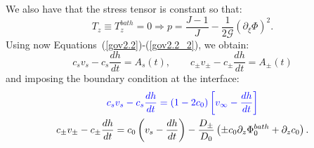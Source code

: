 \documentclass[12pt]{extarticle}
\begin{document}
We also have that the stress tensor is constant so that:
\begin{equation}
T_z\equiv T^{bath}_z=0 \Rightarrow p = \frac{J-1}{J}-\frac{1}{2\mathcal{G}} (\partial_\xi \Phi)^2.
\end{equation}
Using now Equations~(\ref{gov2.2})-(\ref{gov2.2_2}), we obtain:
\begin{equation}
c_s v_s - c_s \frac{dh}{dt}=A_s(t), \qquad c_\pm v_\pm - c_\pm \frac{dh}{dt}=A_\pm(t)
\end{equation}
and imposing the boundary condition at the interface:
\begin{gather}
\color{blue}c_s v_s - c_s \frac{dh}{dt}=(1-2c_0)\left[v_\infty-\frac{dh}{dt}\right]\\
c_\pm v_\pm - c_\pm \frac{dh}{dt}=c_0\left( v_s - \frac{dh}{dt}\right)  -\frac{D_\pm}{D_0}\left(\pm c_0 \partial_z \Phi^{bath}_0+\partial_z c_0\right).
\end{gather}
\end{document}
